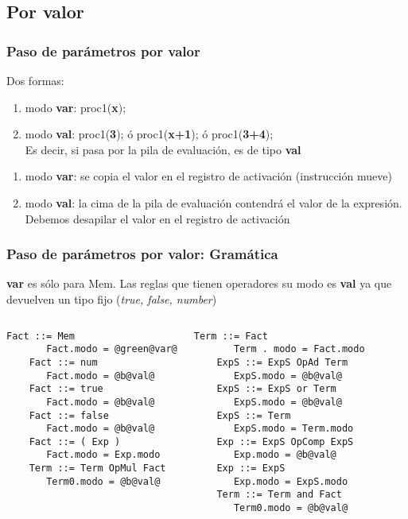 \documentclass[hyperref={pdfpagelabels=false},tree-dvips,compress]{beamer}
\begin{document}
\subsection{Por valor}
\begin{frame}[fragile]
\frametitle{Paso de parámetros por valor}

Dos formas:
\begin{enumerate}[<+->]
	\item modo \textbf{var}: proc1(\textbf{x});
	\item modo \textbf{val}: proc1(\textbf{3}); ó proc1(\textbf{x+1}); ó proc1(\textbf{3+4});\\
	Es decir, si pasa por la pila de evaluación, es de tipo \textbf{val}
\end{enumerate}

\begin{enumerate}[<+->]
	\item modo \textbf{var}: se copia el valor en el
registro de activación (instrucción mueve)
	\item modo \textbf{val}: la cima de la pila de
evaluación contendrá el valor de la expresión. Debemos desapilar el valor en el registro de activación
\end{enumerate}

\end{frame}
\begin{frame}[fragile]
\frametitle{Paso de parámetros por valor: Gramática}

\textbf{var} es sólo para Mem. Las reglas que tienen operadores su modo es \textbf{val} ya que devuelven un tipo fijo (\emph{true, false, number})

\begin{columns}[T]
	\begin{lstlisting}[style=gramaticas,basicstyle=\footnotesize\ttfamily]
	Fact ::= Mem
	   Fact.modo = @green@var@
	Fact ::= num
	   Fact.modo = @b@val@
	Fact ::= true
	   Fact.modo = @b@val@
	Fact ::= false
	   Fact.modo = @b@val@
	Fact ::= ( Exp )
	   Fact.modo = Exp.modo
	Term ::= Term OpMul Fact
	   Term0.modo = @b@val@
	\end{lstlisting}

	\begin{lstlisting}[style=gramaticas,basicstyle=\footnotesize\ttfamily]
	Term ::= Fact
	   Term . modo = Fact.modo
	ExpS ::= ExpS OpAd Term
	   ExpS.modo = @b@val@
	ExpS ::= ExpS or Term
	   ExpS.modo = @b@val@
	ExpS ::= Term
	   ExpS.modo = Term.modo
	Exp ::= ExpS OpComp ExpS
	   Exp.modo = @b@val@
	Exp ::= ExpS
	   Exp.modo = ExpS.modo
	Term ::= Term and Fact
	   Term0.modo = @b@val@
	\end{lstlisting}

\end{columns}

\end{frame}
\end{document}
